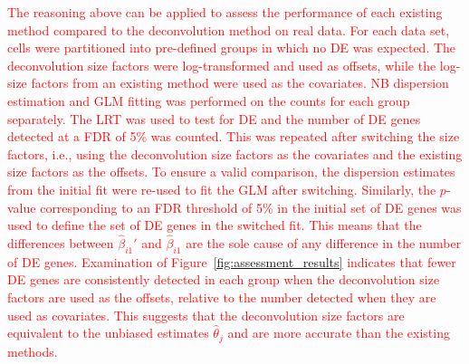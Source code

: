 \documentclass{article}
\newcommand\revised[1]{\textcolor{red}{#1}}
\begin{document}
\revised{The reasoning above can be applied to assess the performance of each existing method compared to the deconvolution method on real data.
For each data set, cells were partitioned into pre-defined groups in which no DE was expected.
The deconvolution size factors were log-transformed and used as offsets, while the log-size factors from an existing method were used as the covariates.
NB dispersion estimation and GLM fitting was performed on the counts for each group separately.
The LRT was used to test for DE and the number of DE genes detected at a FDR of 5\% was counted.
This was repeated after switching the size factors, i.e., using the deconvolution size factors as the covariates and the existing size factors as the offsets.
To ensure a valid comparison, the dispersion estimates from the initial fit were re-used to fit the GLM after switching.
Similarly, the $p$-value corresponding to an FDR threshold of 5\% in the initial set of DE genes was used to define the set of DE genes in the switched fit.
This means that the differences between $\hat\beta_{i1}'$ and $\hat\beta_{i1}$ are the sole cause of any difference in the number of DE genes.
Examination of Figure~\ref{fig:assessment_results} indicates that fewer DE genes are consistently detected in each group when the deconvolution size factors are used as the offsets, relative to the number detected when they are used as covariates.
This suggests that the deconvolution size factors are equivalent to the unbiased estimates $\hat\theta_j$ and are more accurate than the existing methods. 
}
\end{document}
